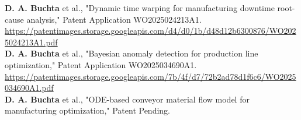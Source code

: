 \textbf{D. A. Buchta} et al., "Dynamic time warping for manufacturing downtime root-cause analysis," Patent Application WO2025024213A1. \url{https://patentimages.storage.googleapis.com/d4/d0/1b/d48d12b6300876/WO2025024213A1.pdf}
\vspace{9pt}\\
\textbf{D. A. Buchta} et al., "Bayesian anomaly detection for production line optimization," Patent Application WO2025034690A1. \url{https://patentimages.storage.googleapis.com/7b/4f/d7/72b2ad78d1f6c6/WO2025034690A1.pdf}
\vspace{9pt}\\
\textbf{D. A. Buchta} et al., "ODE-based conveyor material flow model for manufacturing optimization," Patent Pending.
